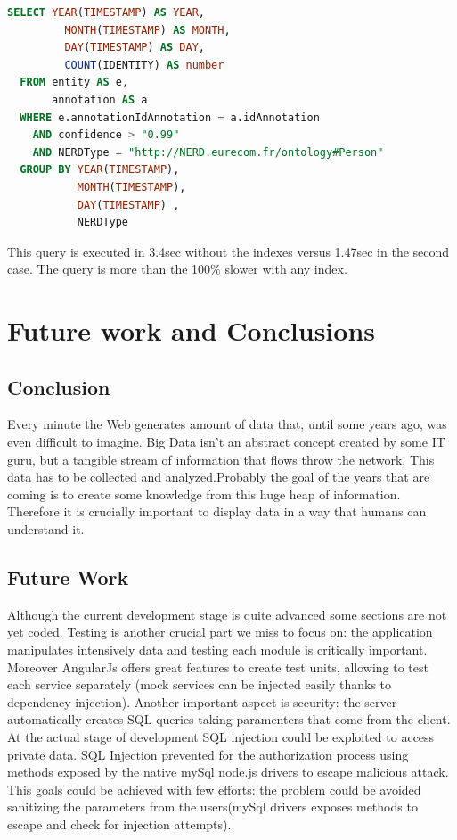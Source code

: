 \documentclass[a4paper,13pt]{report}
\begin{document}
\vspace{0.9cm}
        \begin{lstlisting}[language=SQL]
  SELECT YEAR(TIMESTAMP) AS YEAR,
         MONTH(TIMESTAMP) AS MONTH,
         DAY(TIMESTAMP) AS DAY,
         COUNT(IDENTITY) AS number
  FROM entity AS e,
       annotation AS a
  WHERE e.annotationIdAnnotation = a.idAnnotation
    AND confidence > "0.99"
    AND NERDType = "http://NERD.eurecom.fr/ontology#Person"
  GROUP BY YEAR(TIMESTAMP),
           MONTH(TIMESTAMP),
           DAY(TIMESTAMP) ,
           NERDType
        \end{lstlisting}
\vspace{0.3cm}
This query is executed in 3.4sec without the indexes versus 1.47sec in the second case. The query is more than the 100\% slower with any index.

\chapter{Future work and Conclusions} %
\label{cha:future_work_and_conclusions}
\section{Conclusion}
Every minute the Web generates amount of data that, until some years ago, was even difficult to imagine. Big Data isn't an abstract concept created by some IT guru, but a tangible stream of information that flows throw the network. This data has to be collected and analyzed.Probably the goal of the years that are coming is to create some knowledge from this huge heap of information. Therefore it is crucially important to display data in a way that humans can understand it.
\section{Future Work}
Although the current development stage is quite advanced some sections are  not yet coded.
Testing is another crucial part we miss to focus on: the application manipulates intensively data and testing each module is critically important. Moreover AngularJs offers great features to create test units, allowing to test each service separately (mock services can be injected easily thanks to dependency injection).\newline
Another important aspect is security: the server automatically creates SQL queries taking paramenters that come from the client. At the actual stage of development SQL injection could be exploited to access private data. SQL Injection prevented for the authorization process using methods exposed by the native mySql node.js drivers to escape malicious attack.
This goals could be achieved with few efforts: the problem could be avoided sanitizing the parameters from the users(mySql drivers exposes methods to escape and check for injection attempts).\newline
\end{document}
